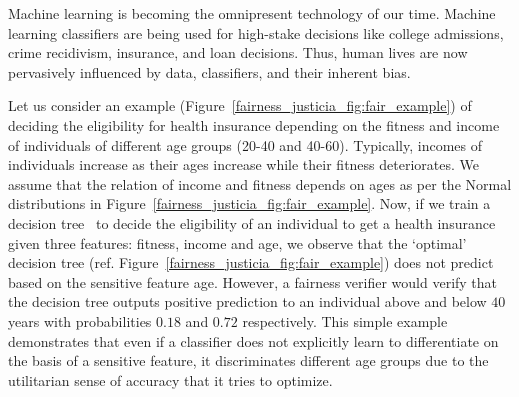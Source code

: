 \label{chapter:justicia}
Machine learning is becoming the omnipresent technology of our time. Machine learning classifiers are being used for high-stake decisions like college admissions, crime recidivism, insurance, and loan decisions. Thus, human lives are now pervasively influenced by data, classifiers, and their inherent bias.

\begin{example}\label{fairness_justicia_example:intro}
\normalfont
Let us consider an example (Figure~\ref{fairness_justicia_fig:fair_example}) of deciding the eligibility for health insurance depending on the fitness and income of individuals of different age groups (20-40 and 40-60). Typically, incomes of individuals increase as their ages increase while their fitness deteriorates. We assume that the relation of income and fitness depends on ages as per the Normal distributions in Figure~\ref{fairness_justicia_fig:fair_example}. Now, if we train a decision tree~\cite{narodytska2018learning} to decide the eligibility of an individual to get a health insurance given three features: fitness, income and age, we observe that the `optimal' decision tree (ref. Figure~\ref{fairness_justicia_fig:fair_example}) does not predict based on the sensitive feature age. However, a fairness verifier would verify that the decision tree outputs positive prediction to an individual above and below $40$ years with probabilities $0.18$ and $0.72$ respectively. This simple example demonstrates that even if a classifier does not explicitly learn to differentiate on the basis of a sensitive feature, it discriminates different age groups due to the utilitarian sense of accuracy that it tries to optimize.
\end{example}

